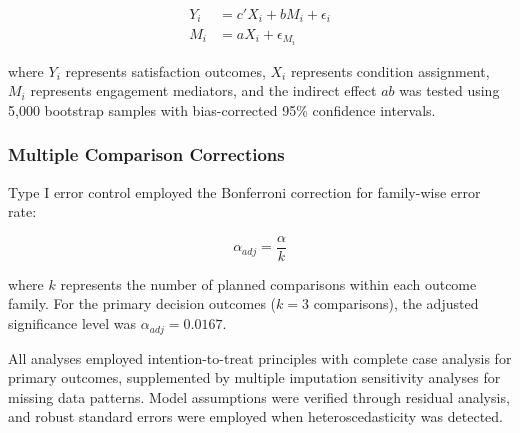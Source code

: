 \documentclass[conference]{IEEEtran}
\begin{document}
\begin{align}
Y_i &= c'X_i + bM_i + \epsilon_i \\
M_i &= aX_i + \epsilon_{M_i}
\end{align}

where $Y_i$ represents satisfaction outcomes, $X_i$ represents condition assignment, $M_i$ represents engagement mediators, and the indirect effect $ab$ was tested using 5,000 bootstrap samples with bias-corrected 95\% confidence intervals.

\subsubsection{Multiple Comparison Corrections}

Type I error control employed the Bonferroni correction for family-wise error rate:

\begin{equation}
\alpha_{adj} = \frac{\alpha}{k}
\end{equation}

where $k$ represents the number of planned comparisons within each outcome family. For the primary decision outcomes ($k = 3$ comparisons), the adjusted significance level was $\alpha_{adj} = 0.0167$.

All analyses employed intention-to-treat principles with complete case analysis for primary outcomes, supplemented by multiple imputation sensitivity analyses for missing data patterns. Model assumptions were verified through residual analysis, and robust standard errors were employed when heteroscedasticity was detected.
\end{document}
